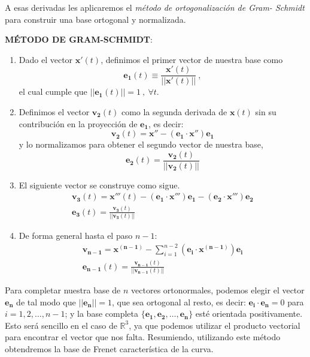 A esas derivadas les aplicaremos el \emph{método de ortogonalización de Gram- Schmidt} para construir una base ortogonal y normalizada.
\begin{mybox}
    \begin{center}
        \textbf{MÉTODO DE GRAM-SCHMIDT}:\\
        \begin{enumerate}
            \item[\fbox{1}] Dado el vector $\mathbf{x'}(t)$, definimos el primer vector de nuestra base como $$\boxed{\mathbf{e_1}(t)\equiv \frac{\mathbf{x'}(t)}{||\mathbf{x'}(t)||}}\ ,$$el cual cumple que $||\mathbf{e_1}(t)||=1 \ , \ \forall t$.

            \item[\fbox{2}] Definimos el vector $\mathbf{v_2}(t)$ como la segunda derivada de $\mathbf{x}(t)$ sin su contribución en la proyección de $\mathbf{e_1}$, es decir:
            $$
            \mathbf{v_2}(t)=\mathbf{x''}-(\mathbf{e_1\cdot x''})\mathbf{e_1}
            $$
            y lo normalizamos para obtener el segundo vector de nuestra base,
            $$
            \boxed{\mathbf{e_2}(t)=\frac{\mathbf{v_2}(t)}{||\mathbf{v_2}(t)||}}
            $$

            \item[\fbox{3}] El siguiente vector se construye como sigue.
            \begin{gather*}
                \mathbf{v_3}(t)=\mathbf{x'''}(t)-(\mathbf{e_1\cdot x'''})\mathbf{e_1}-(\mathbf{e_2\cdot x'''})\mathbf{e_2}\\
                \boxed{\mathbf{e_3}(t)=\frac{\mathbf{v_3}(t)}{||\mathbf{v_3}(t)||}}
            \end{gather*}

            \item[\fbox{n-1}] De forma general hasta el paso $n-1$:
            \begin{gather*}
                \mathbf{v_{n-1}}=\mathbf{x^{(n-1)}}-\sum_{i=1}^{n-2} \left (\mathbf{e_i\cdot x^{(n-1)}} \right )\mathbf{e_i} \\
                \boxed{\mathbf{e_{n-1}}(t)=\frac{\mathbf{v_{n-1}}(t)}{|| \mathbf{v_{n-1}}(t) ||}}
            \end{gather*}
        \end{enumerate}
    \end{center}
\end{mybox}

Para completar nuestra base de $n$ vectores ortonormales, podemos elegir el vector $\mathbf{e_n}$ de tal modo que $||\mathbf{e_n}||=1$, que sea ortogonal al resto, es decir: $\mathbf{e_i\cdot e_n}=0$ para $i=1,2,\ldots ,n-1$; y la base completa $\{ \mathbf{e_1,e_2,\ldots , e_n} \}$ esté orientada positivamente. Esto será sencillo en el caso de $\mathbb{R}^3$, ya que podemos utilizar el producto vectorial para encontrar el vector que nos falta. Resumiendo, utilizando este método obtendremos la base de Frenet característica de la curva.\\

